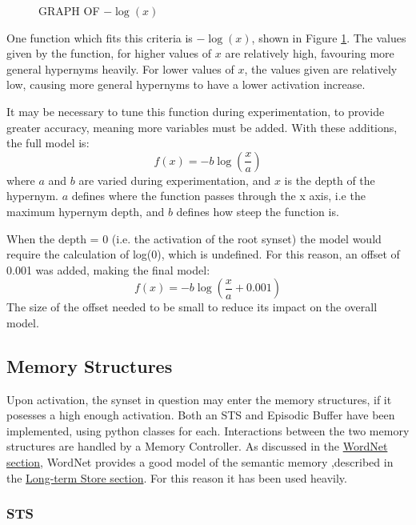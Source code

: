 \documentclass[]{article}
\begin{document}
\begin{figure}[h]
\caption{GRAPH OF $-\log(x)$}
\label{fig:logGraph}
\end{figure}

One function which fits this criteria is $-\log(x)$, shown in Figure \ref{fig:logGraph}. The values given by the function, for higher values of $x$ are relatively high, favouring more general hypernyms heavily. For lower values of $x$, the values given are relatively low, causing more general hypernyms to have a lower activation increase.

It may be necessary to tune this function during experimentation, to provide greater accuracy, meaning more variables must be added. With these additions, the full model is:
\[f(x) = -b\log(\frac{x}{a})\]
where $a$ and $b$ are varied during experimentation, and $x$ is the depth of the hypernym. $a$ defines where the function passes through the x axis, i.e the maximum hypernym depth, and $b$ defines how steep the function is.

When the depth = 0 (i.e. the activation of the root synset) the model would require the calculation of log(0), which is undefined. For this reason, an offset of 0.001 was added, making the final model:
\[f(x) = -b\log(\frac{x}{a}+0.001)\]
The size of the offset needed to be small to reduce its impact on the overall model.


\subsection{Memory Structures}
\label{sec:ImplementedMemoryStructures}

Upon activation, the synset in question may enter the memory structures, if it posesses a high enough activation. Both an STS and Episodic Buffer have been implemented, using python classes for each. Interactions between the two memory structures are handled by a Memory Controller. As discussed in the \hyperref[Wordnet]{WordNet section}, WordNet provides a good model of the semantic memory \cite{WN1Introduction},described in the \hyperref[LongTerm]{Long-term Store section}. For this reason it has been used heavily.

\subsubsection{STS}
\label{sec:ImplementedSTS}
\end{document}

